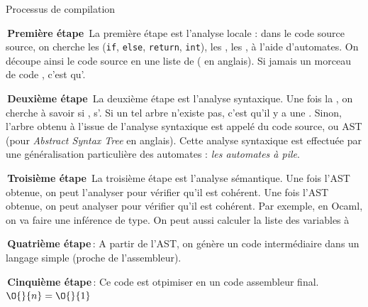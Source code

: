     \begin{form}{Processus de compilation}{}
        \begin{enumerate}
            \itt \colorbox{colform!20}{\textnormal{\color{colform}\sffamily\bfseries \,Première étape\,}} La première étape est l'analyse locale : dans le code source source, on cherche les  (\texttt{if}, \texttt{else}, \texttt{return}, \texttt{int}), les , les , \etc à l'aide d'automates. On découpe ainsi le code source en une liste de  ( en anglais). Si jamais un morceau de code , c'est qu'.
             
            \itt \colorbox{colform!20}{\textnormal{\color{colform}\sffamily\bfseries \,Deuxième étape\,}} La deuxième étape est l'analyse syntaxique. Une fois la , on cherche à savoir si , \ie s'. Si un tel arbre n'existe pas, c'est qu'il y a une . Sinon, l'arbre obtenu à l'issue de l'analyse syntaxique est appelé \emph{} du code source, ou AST (pour \emph{Abstract Syntax Tree} en anglais). Cette analyse syntaxique est effectuée par une généralisation particulière des automates : \emph{les automates à pile}.
                
            
            \itt \colorbox{colform!20}{\textnormal{\color{colform}\sffamily\bfseries \,Troisième étape\,}} La troisième étape est l'analyse sémantique. Une fois l'AST obtenue, on peut l'analyser pour vérifier qu'il est cohérent.
            Une fois l'AST obtenue, on peut analyser pour vérifier qu'il est cohérent. Par exemple, en \textsf{Ocaml}, on va faire une inférence de type. On peut aussi calculer la liste des variables à 
            
            
            \itt \colorbox{colform!20}{\textnormal{\color{colform}\sffamily\bfseries \,Quatrième étape\,}}: A partir de l'AST, on génère un code intermédiaire dans un langage simple (proche de l'assembleur).
            
            \itt \colorbox{colform!20}{\textnormal{\color{colform}\sffamily\bfseries \,Cinquième étape\,}}: Ce code est otpimiser en un code assembleur final. $\O{}{n} = \O{}{1}$
             
        \end{enumerate}
    \end{form}
    
